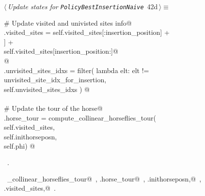 \documentclass[11.5pt]{report}
\begin{document}
\vspace{-0.8cm}\newchunk 
\begin{flushleft} \small\label{scrap51}\raggedright\small
{} $\langle\,${\itshape Update states for \texttt{PolicyBestInsertionNaive}}\nobreak\ {\footnotesize {42d}}$\,\rangle\equiv$
\vspace{-1ex}
\begin{list}{}{} \item
\mbox{}\verb@# Update visited and univisted sites info@\\
\mbox{}\verb@self.visited_sites = self.visited_sites[:insertion_position]      +\@\\
\mbox{}\verb@                     [self.sites[unvisited_site_idx_for_insertion]] +\@\\
\mbox{}\verb@                     self.visited_sites[insertion_position:]@\\
\mbox{}\verb@  @\\
\mbox{}\verb@self.unvisited_sites_idxs = filter( lambda elt: elt != unvisited_site_idx_for_insertion, \@\\
\mbox{}\verb@                                    self.unvisited_sites_idxs ) @\\
\mbox{}\verb@@\\
\mbox{}\verb@# Update the tour of the horse@\\
\mbox{}\verb@self.horse_tour = compute_collinear_horseflies_tour(\@\\
\mbox{}\verb@                           self.visited_sites,         \@\\
\mbox{}\verb@                           self.inithorseposn, \@\\
\mbox{}\verb@                           self.phi) @\\
\mbox{}\verb@@{\NWsep}
\end{list}
\vspace{-1.5ex}
\footnotesize
\begin{list}{}{\setlength{\itemsep}{-\parsep}\setlength{\itemindent}{-\leftmargin}}
\item \NWtxtMacroRefIn\ .
\item \NWtxtIdentsUsed\nobreak\  \verb@compute_collinear_horseflies_tour@\nobreak\ , \verb@self.horse_tour@\nobreak\ , \verb@self.inithorseposn,@\nobreak\ , \verb@self.visited_sites,@\nobreak\ .
\item{}
\end{list}
\vspace{4ex}
\end{flushleft}
\end{document}
